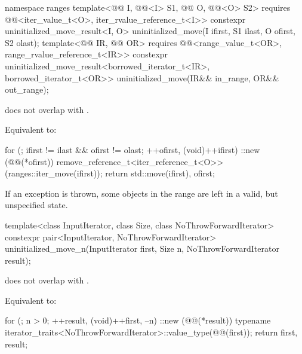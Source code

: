 %
\begin{itemdecl}
namespace ranges {
  template<@@ I, @@<I> S1,
           @@ O, @@<O> S2>
    requires @@<iter_value_t<O>, iter_rvalue_reference_t<I>>
    constexpr uninitialized_move_result<I, O>
      uninitialized_move(I ifirst, S1 ilast, O ofirst, S2 olast);
  template<@@ IR, @@ OR>
    requires @@<range_value_t<OR>, range_rvalue_reference_t<IR>>
    constexpr uninitialized_move_result<borrowed_iterator_t<IR>, borrowed_iterator_t<OR>>
      uninitialized_move(IR&& in_range, OR&& out_range);
}
\end{itemdecl}

\begin{itemdescr}
\pnum
\expects
{} does not overlap with .

\pnum
\effects
Equivalent to:
\begin{codeblock}
for (; ifirst != ilast && ofirst != olast; ++ofirst, (void)++ifirst)
  ::new (@@(*ofirst))
    remove_reference_t<iter_reference_t<O>>(ranges::iter_move(ifirst));
return {std::move(ifirst), ofirst};
\end{codeblock}

\pnum
\begin{note}
If an exception is thrown, some objects in the range  are
left in a valid, but unspecified state.
\end{note}
\end{itemdescr}

%
\begin{itemdecl}
template<class InputIterator, class Size, class NoThrowForwardIterator>
  constexpr pair<InputIterator, NoThrowForwardIterator>
    uninitialized_move_n(InputIterator first, Size n, NoThrowForwardIterator result);
\end{itemdecl}

\begin{itemdescr}
\pnum
\expects
{} does not overlap with .

\pnum
\effects
Equivalent to:
\begin{codeblock}
for (; n > 0; ++result, (void)++first, --n)
  ::new (@@(*result))
    typename iterator_traits<NoThrowForwardIterator>::value_type(@@(first));
return {first, result};
\end{codeblock}
\end{itemdescr}

